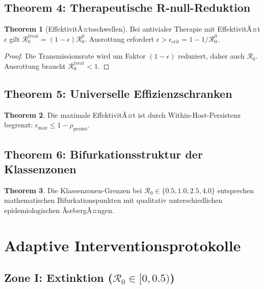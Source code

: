 ﻿\documentclass[a4paper,12pt,twoside]{article}
\theoremstyle{definition}
\newtheorem{theorem}{Theorem}[section]
\begin{document}
\subsection{Theorem 4: Therapeutische R-null-Reduktion}

\begin{theorem}[EffektivitÃ¤tsschwellen]
Bei antivialer Therapie mit EffektivitÃ¤t $\epsilon$ gilt $\mathcal{R}_0^{\text{treat}} = (1-\epsilon) \mathcal{R}_0^0$. Ausrottung erfordert $\epsilon > \epsilon_{\text{crit}} = 1 - 1/\mathcal{R}_0^0$.
\end{theorem}

\begin{proof}
Die Transmissionsrate wird um Faktor $(1-\epsilon)$ reduziert, daher auch $\mathcal{R}_0$. Ausrottung braucht $\mathcal{R}_0^{\text{treat}} < 1$.
\end{proof}

\subsection{Theorem 5: Universelle Effizienzschranken}

\begin{theorem}
Die maximale EffektivitÃ¤t ist durch Within-Host-Persistenz begrenzt: $\epsilon_{\max} \leq 1 - \rho_{\text{persist}}$.
\end{theorem}

\subsection{Theorem 6: Bifurkationsstruktur der Klassenzonen}

\begin{theorem}
Die Klassenzonen-Grenzen bei $\mathcal{R}_0 \in \{0.5, 1.0, 2.5, 4.0\}$ entsprechen mathematischen Bifurkationspunkten mit qualitativ unterschiedlichen epidemiologischen ÃœbergÃ¤ngen.
\end{theorem}

\section{Adaptive Interventionsprotokolle}
\label{sec:interventions}

\subsection{Zone I: Extinktion ($\mathcal{R}_0 \in [0, 0.5)$)}
\end{document}

